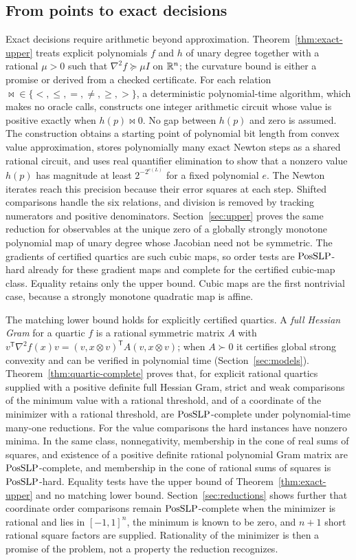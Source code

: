 \subsection{From points to exact decisions}
\label{sec:intro-exact}

Exact decisions require arithmetic beyond approximation.
Theorem~\ref{thm:exact-upper} treats explicit polynomials $f$ and $h$ of
unary degree together with a rational $\mu>0$ such that
$\nabla^2f\succeq\mu I$ on $\mathbb R^n$; the curvature bound is either a promise or
derived from a checked certificate. For each relation
${\bowtie}\in\{<,\le,=,\ne,\ge,>\}$, a deterministic polynomial-time algorithm,
which makes no oracle calls, constructs one integer arithmetic circuit whose
value is positive exactly when $h(p)\bowtie0$. No gap between $h(p)$ and zero
is assumed. The construction obtains a starting point of polynomial bit
length from convex value approximation, stores polynomially many exact
Newton steps as a shared rational circuit, and uses real quantifier
elimination to show that a nonzero value $h(p)$ has magnitude at least
$2^{-2^{e(L)}}$ for a fixed polynomial $e$. The Newton iterates reach this
precision because their error squares at each step. Shifted comparisons
handle the six relations, and division is removed by tracking numerators
and positive denominators. Section~\ref{sec:upper} proves the same reduction
for observables at the unique zero of a globally strongly monotone polynomial
map of unary degree whose Jacobian need not be symmetric. The gradients
of certified quartics are such cubic maps, so order tests are
$\mathrm{PosSLP}$-hard already for these gradient maps and complete for the
certified cubic-map class. Equality retains only the upper bound. Cubic maps are
the first nontrivial case, because a strongly monotone quadratic map is
affine.

The matching lower bound holds for explicitly certified quartics. A
\emph{full Hessian Gram} for a quartic $f$ is a rational
symmetric matrix $A$ with
$v^{\mathsf T}\nabla^2f(x)v=(v,x\otimes v)^{\mathsf T}A(v,x\otimes v)$; when
$A\succ0$ it certifies global strong convexity and can be verified in
polynomial time (Section~\ref{sec:models}). Theorem~\ref{thm:quartic-complete}
proves that, for explicit rational quartics supplied with a positive definite
full Hessian Gram, strict and weak comparisons of the minimum value with a
rational threshold, and of a coordinate of the minimizer with a rational
threshold, are $\mathrm{PosSLP}$-complete under polynomial-time many-one reductions.
For the value comparisons the hard instances have nonzero minima. In the same
class, nonnegativity, membership in the cone of real sums of squares, and
existence of a positive definite rational polynomial Gram matrix are
$\mathrm{PosSLP}$-complete, and membership in the cone of rational sums of squares is
$\mathrm{PosSLP}$-hard. Equality tests have the upper bound of
Theorem~\ref{thm:exact-upper} and no matching lower bound.
Section~\ref{sec:reductions} shows further that coordinate order comparisons
remain $\mathrm{PosSLP}$-complete when the minimizer is rational and lies in
$[-1,1]^n$, the minimum is known to be zero, and $n+1$ short rational square
factors are supplied. Rationality of the minimizer is then a promise of the
problem, not a property the reduction recognizes.

